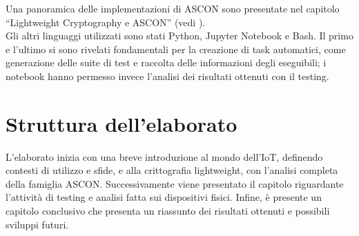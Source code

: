 \noindent Una panoramica delle implementazioni di ASCON sono presentate nel capitolo ``Lightweight Cryptography e ASCON'' (vedi ). \\

\noindent Gli altri linguaggi utilizzati sono stati Python, Jupyter Notebook e Bash. Il primo e l'ultimo si sono rivelati fondamentali per la creazione di task automatici, come generazione delle suite di test e raccolta delle informazioni degli eseguibili; i notebook hanno permesso invece l'analisi dei risultati ottenuti con il testing.

\section{Struttura dell'elaborato}

L'elaborato inizia con una breve introduzione al mondo dell'IoT, definendo contesti di utilizzo e sfide, e alla crittografia lightweight, con l'analisi completa della famiglia ASCON. Successivamente viene presentato il capitolo riguardante l'attività di testing e analisi fatta sui dispositivi fisici. Infine, è presente un capitolo conclusivo che presenta un riassunto dei risultati ottenuti e possibili sviluppi futuri.
